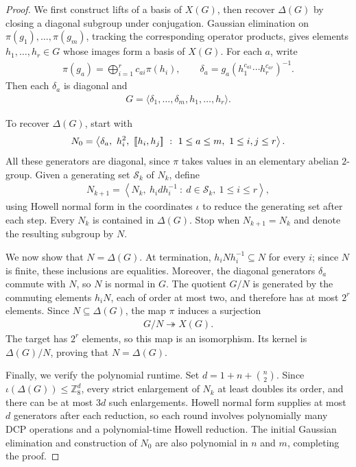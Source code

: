 \begin{proof}
We first construct lifts of a basis of $X(G)$, then recover $\Delta(G)$ by closing a diagonal subgroup under conjugation.
Gaussian elimination on $\pi(g_1),\ldots,\pi(g_m)$, tracking the corresponding operator products, gives elements $h_1,\ldots,h_r\in G$ whose images form a basis of $X(G)$.
For each $a$, write
\begin{align}
    \pi(g_a)=\bigoplus_{i=1}^r c_{ai}\pi(h_i),
    \qquad
    \delta_a=g_a\left(h_1^{c_{a1}}\cdots h_r^{c_{ar}}\right)^{-1}.
\end{align}
Then each $\delta_a$ is diagonal and
\begin{align}
    G=\langle\delta_1,\ldots,\delta_m,h_1,\ldots,h_r\rangle.
\end{align}

To recover $\Delta(G)$, start with
\begin{align}
    N_0=\left\langle\delta_a,\ h_i^2,\ \mathopen{[\![}h_i,h_j\mathclose{]\!]}\ :\ 1\leq a\leq m,\ 1\leq i,j\leq r\right\rangle.
\end{align}
All these generators are diagonal, since $\pi$ takes values in an elementary abelian $2$-group.
Given a generating set $\mathcal S_k$ of $N_k$, define
\begin{align}
    N_{k+1}=\left\langle N_k,\ h_i d h_i^{-1}\ :\ d\in\mathcal S_k,\ 1\leq i\leq r\right\rangle,
\end{align}
using Howell normal form in the coordinates $\iota$ to reduce the generating set after each step.
Every $N_k$ is contained in $\Delta(G)$.
Stop when $N_{k+1}=N_k$ and denote the resulting subgroup by $N$.

We now show that $N=\Delta(G)$.
At termination, $h_iNh_i^{-1}\subseteq N$ for every $i$; since $N$ is finite, these inclusions are equalities.
Moreover, the diagonal generators $\delta_a$ commute with $N$, so $N$ is normal in $G$.
The quotient $G/N$ is generated by the commuting elements $h_iN$, each of order at most two, and therefore has at most $2^r$ elements.
Since $N\subseteq\Delta(G)$, the map $\pi$ induces a surjection
\begin{align}
    G/N\twoheadrightarrow X(G).
\end{align}
The target has $2^r$ elements, so this map is an isomorphism.
Its kernel is $\Delta(G)/N$, proving that $N=\Delta(G)$.

Finally, we verify the polynomial runtime.
Set $d=1+n+\binom{n}{2}$.
Since $\iota(\Delta(G))\leq\mathbb Z_8^d$, every strict enlargement of $N_k$ at least doubles its order, and there can be at most $3d$ such enlargements.
Howell normal form supplies at most $d$ generators after each reduction, so each round involves polynomially many DCP operations and a polynomial-time Howell reduction.
The initial Gaussian elimination and construction of $N_0$ are also polynomial in $n$ and $m$, completing the proof.
\end{proof}

